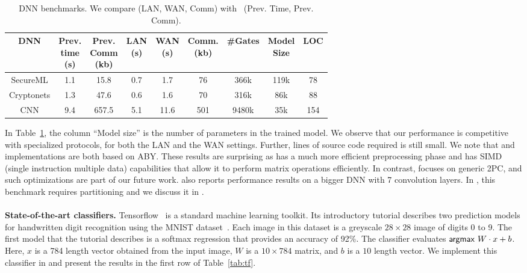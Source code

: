\setlength\tabcolsep{2.5pt}
\begin{table}
\begin{tabular}{|c|c|c|c |c|c|c|c|c|}
\hline
DNN  & \thead{Prev. \\ time\\ (s)} & \thead{Prev. \\ Comm\\ (kb)} & \thead{LAN  \\ (s)} & \thead{WAN\\ (s)} & \thead{Comm. \\(kb)} & \#Gates & \thead{Model\\ Size} & LOC\\
\hline
SecureML   &  1.1 & 15.8 & 0.7 & 1.7  & 76   &   366k   & 119k & 78\\
\hline
Cryptonets &  1.3 & 47.6 & 0.6 & 1.6  & 70    &  316k & 86k & 88\\
\hline
CNN        &  9.4 & 657.5& 5.1 & 11.6 & 501  & 9480k & 35k & 154\\
\hline
\end{tabular}

 \caption{DNN benchmarks. We compare \tool (LAN, WAN, Comm)
 with~\cite{minionn} (Prev. Time, Prev. Comm).}
 \label{tab:nn} 
\end{table}


In Table~\ref{tab:nn}, 
the column ``Model size'' is the number of parameters in the
trained model.
We observe that our performance is competitive with specialized
\minion protocols, for both the LAN and the WAN settings. Further, lines
of \tool source code required is still small. 
We note that \minion and \tool implementations are both based on ABY.
These results are surprising as \minion has a much more efficient
preprocessing phase and has SIMD 
(single instruction multiple data) capabilities that allow it to perform
matrix operations efficiently. In contrast, \tool focuses on generic
2PC, and such optimizations are part of our future work.
\minion also reports performance results on a bigger DNN with 7
convolution layers. In \tool, this benchmark requires partitioning and
we discuss it in .
\\\\
\noindent\textbf{State-of-the-art classifiers.}
Tensorflow~\cite{tensorflow} is a standard machine learning toolkit.
Its introductory tutorial describes two prediction models for handwritten digit recognition
using the MNIST dataset~\cite{mnist}.
Each image in this dataset is a greyscale $28\times 28$ image of
digits 0 to 9.
The first model that the tutorial describes is a softmax regression
that provides an accuracy of 92\%. The classifier evaluates
$ \mathsf{argmax}\ W\cdot x+b$.
Here, $x$ is a 784 length vector obtained from the input image,
 $W$ is a $10\times 784$ matrix, and  $b$ is a $10$ length
vector.
We implement this classifier in \tool and present the results in the
first row of Table~\ref{tab:tf}. 


